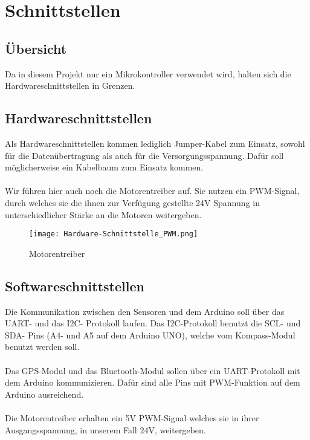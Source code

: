 \section{Schnittstellen}

\subsection{Übersicht}
Da in diesem Projekt nur ein Mikrokontroller verwendet wird, halten sich die Hardwareschnittstellen in Grenzen.

\subsection{Hardwareschnittstellen}
Als Hardwareschnittstellen kommen lediglich Jumper-Kabel zum Einsatz, sowohl für die Datenübertragung als auch für die Versorgungsspannung. Dafür soll möglicherweise ein Kabelbaum zum Einsatz kommen. \\
\\
Wir führen hier auch noch die Motorentreiber auf. Sie nutzen ein PWM-Signal, durch welches sie die ihnen zur Verfügung gestellte 24V Spannung in unterschiedlicher Stärke an die Motoren weitergeben. 

\begin{figure}[H]
    \begin{center}
    \texttt{[image: Hardware-Schnittstelle\_PWM.png]}
    \end{center}
    \caption{Motorentreiber}
\end{figure}

\subsection{Softwareschnittstellen}
Die Kommunikation zwischen den Sensoren und dem Arduino soll über das UART- und das I2C- Protokoll laufen. Das I2C-Protokoll benutzt die SCL- und SDA- Pins (A4- und A5 auf dem Arduino UNO), welche vom Kompass-Modul benutzt werden soll.\\
\\
Das GPS-Modul und das Bluetooth-Modul sollen über ein UART-Protokoll mit dem Arduino kommunizieren. Dafür sind alle Pins mit PWM-Funktion auf dem Arduino ausreichend. \\
\\
Die Motorentreiber erhalten ein 5V PWM-Signal welches sie in ihrer Ausgangsspannung, in unserem Fall 24V, weitergeben.
